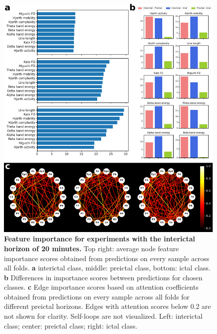\documentclass[a4paper,fleqn]{cas-sc}
\begin{document}
\begin{figure}[h]
    \centering
    \includegraphics[width=\linewidth]{figures/lookback_1200.pdf}
    \caption{\textbf{Feature importance for experiments with the interictal horizon of 20 minutes.} Top right: average node feature importance scores obtained from predictions on every sample across all folds. \textbf{a} interictal class, middle: preictal class, bottom: ictal class. \textbf{b} Differences in importance scores between predictions for chosen classes. \textbf{c} Edge importance scores based on attention coefficients obtained from predictions on every sample across all folds for different preictal horizons. Edges with attention scores below 0.2 are not shown for clarity. Self-loops are not visualized. Left: interictal class; center: preictal class; right: ictal class.}
    \label{figs5:lookback_1200}
\end{figure}
\end{document}
